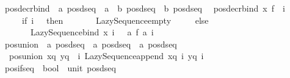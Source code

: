 \begin{isabellebody}
\isanewline
{}\isamarkupfalse%
\ pos{\isacharunderscore}{\kern0pt}decr{\isacharunderscore}{\kern0pt}bind\ {\isacharcolon}{\kern0pt}{\isacharcolon}{\kern0pt}\ {\isachardoublequoteopen}{\isacharprime}{\kern0pt}a\ pos{\isacharunderscore}{\kern0pt}dseq\ {\isasymRightarrow}\ {\isacharparenleft}{\kern0pt}{\isacharprime}{\kern0pt}a\ {\isasymRightarrow}\ {\isacharprime}{\kern0pt}b\ pos{\isacharunderscore}{\kern0pt}dseq{\isacharparenright}{\kern0pt}\ {\isasymRightarrow}\ {\isacharprime}{\kern0pt}b\ pos{\isacharunderscore}{\kern0pt}dseq{\isachardoublequoteclose}\isanewline
{}\isanewline
\ \ {\isachardoublequoteopen}pos{\isacharunderscore}{\kern0pt}decr{\isacharunderscore}{\kern0pt}bind\ x\ f\ {\isacharequal}{\kern0pt}\ {\isacharparenleft}{\kern0pt}{\isasymlambda}i{\isachardot}{\kern0pt}\ \isanewline
\ \ \ \ \ if\ i\ {\isacharequal}{\kern0pt}\ {}\ then\isanewline
\ \ \ \ \ \ \ Lazy{\isacharunderscore}{\kern0pt}Sequence{\isachardot}{\kern0pt}empty\isanewline
\ \ \ \ \ else\isanewline
\ \ \ \ \ \ \ Lazy{\isacharunderscore}{\kern0pt}Sequence{\isachardot}{\kern0pt}bind\ {\isacharparenleft}{\kern0pt}x\ {\isacharparenleft}{\kern0pt}i\ {\isacharminus}{\kern0pt}\ {}{\isacharparenright}{\kern0pt}{\isacharparenright}{\kern0pt}\ {\isacharparenleft}{\kern0pt}{\isasymlambda}a{\isachardot}{\kern0pt}\ f\ a\ i{\isacharparenright}{\kern0pt}{\isacharparenright}{\kern0pt}{\isachardoublequoteclose}\isanewline
\isanewline
{}\isamarkupfalse%
\ pos{\isacharunderscore}{\kern0pt}union\ {\isacharcolon}{\kern0pt}{\isacharcolon}{\kern0pt}\ {\isachardoublequoteopen}{\isacharprime}{\kern0pt}a\ pos{\isacharunderscore}{\kern0pt}dseq\ {\isasymRightarrow}\ {\isacharprime}{\kern0pt}a\ pos{\isacharunderscore}{\kern0pt}dseq\ {\isasymRightarrow}\ {\isacharprime}{\kern0pt}a\ pos{\isacharunderscore}{\kern0pt}dseq{\isachardoublequoteclose}\isanewline
{}\isanewline
\ \ {\isachardoublequoteopen}pos{\isacharunderscore}{\kern0pt}union\ xq\ yq\ {\isacharequal}{\kern0pt}\ {\isacharparenleft}{\kern0pt}{\isasymlambda}i{\isachardot}{\kern0pt}\ Lazy{\isacharunderscore}{\kern0pt}Sequence{\isachardot}{\kern0pt}append\ {\isacharparenleft}{\kern0pt}xq\ i{\isacharparenright}{\kern0pt}\ {\isacharparenleft}{\kern0pt}yq\ i{\isacharparenright}{\kern0pt}{\isacharparenright}{\kern0pt}{\isachardoublequoteclose}\isanewline
\isanewline
{}\isamarkupfalse%
\ pos{\isacharunderscore}{\kern0pt}if{\isacharunderscore}{\kern0pt}seq\ {\isacharcolon}{\kern0pt}{\isacharcolon}{\kern0pt}\ {\isachardoublequoteopen}bool\ {\isasymRightarrow}\ unit\ pos{\isacharunderscore}{\kern0pt}dseq{\isachardoublequoteclose}\isanewline

\end{isabellebody}
